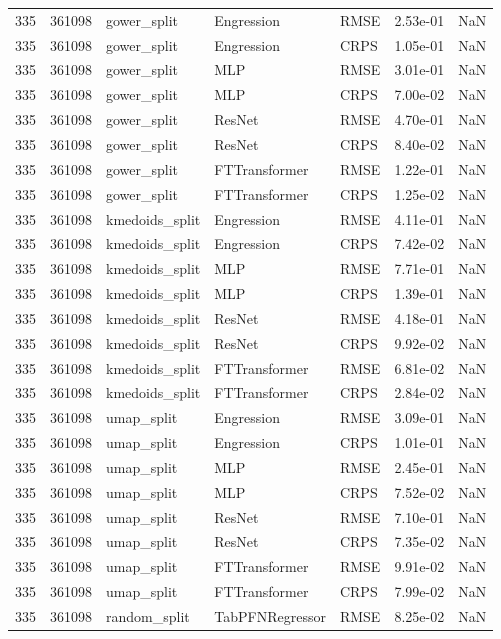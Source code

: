 \begin{tabular}{rrlllrr}
335 & 361098 & gower\_split & Engression & RMSE & 2.53e-01 & NaN \\
335 & 361098 & gower\_split & Engression & CRPS & 1.05e-01 & NaN \\
335 & 361098 & gower\_split & MLP & RMSE & 3.01e-01 & NaN \\
335 & 361098 & gower\_split & MLP & CRPS & 7.00e-02 & NaN \\
335 & 361098 & gower\_split & ResNet & RMSE & 4.70e-01 & NaN \\
335 & 361098 & gower\_split & ResNet & CRPS & 8.40e-02 & NaN \\
335 & 361098 & gower\_split & FTTransformer & RMSE & 1.22e-01 & NaN \\
335 & 361098 & gower\_split & FTTransformer & CRPS & 1.25e-02 & NaN \\
335 & 361098 & kmedoids\_split & Engression & RMSE & 4.11e-01 & NaN \\
335 & 361098 & kmedoids\_split & Engression & CRPS & 7.42e-02 & NaN \\
335 & 361098 & kmedoids\_split & MLP & RMSE & 7.71e-01 & NaN \\
335 & 361098 & kmedoids\_split & MLP & CRPS & 1.39e-01 & NaN \\
335 & 361098 & kmedoids\_split & ResNet & RMSE & 4.18e-01 & NaN \\
335 & 361098 & kmedoids\_split & ResNet & CRPS & 9.92e-02 & NaN \\
335 & 361098 & kmedoids\_split & FTTransformer & RMSE & 6.81e-02 & NaN \\
335 & 361098 & kmedoids\_split & FTTransformer & CRPS & 2.84e-02 & NaN \\
335 & 361098 & umap\_split & Engression & RMSE & 3.09e-01 & NaN \\
335 & 361098 & umap\_split & Engression & CRPS & 1.01e-01 & NaN \\
335 & 361098 & umap\_split & MLP & RMSE & 2.45e-01 & NaN \\
335 & 361098 & umap\_split & MLP & CRPS & 7.52e-02 & NaN \\
335 & 361098 & umap\_split & ResNet & RMSE & 7.10e-01 & NaN \\
335 & 361098 & umap\_split & ResNet & CRPS & 7.35e-02 & NaN \\
335 & 361098 & umap\_split & FTTransformer & RMSE & 9.91e-02 & NaN \\
335 & 361098 & umap\_split & FTTransformer & CRPS & 7.99e-02 & NaN \\
335 & 361098 & random\_split & TabPFNRegressor & RMSE & 8.25e-02 & NaN \\

\end{tabular}
